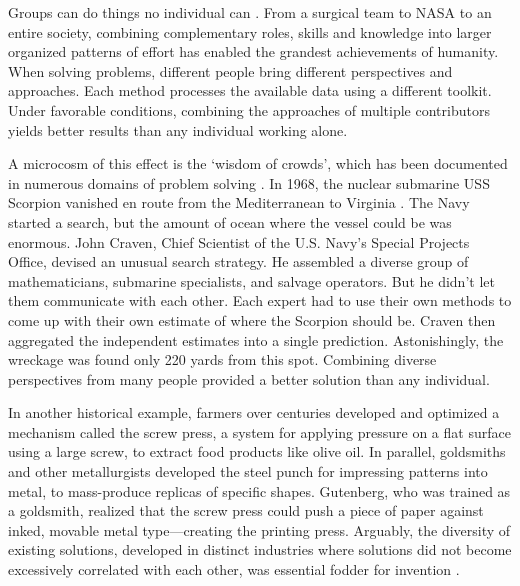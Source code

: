 \documentclass[11pt]{article}
\begin{document}

Groups can do things no individual can \citep{woolley2010evidence, coase1937nature, march1958organizations, coleman1988social, north1990institutions, smith1776inquiry, hayek1945use}. From a surgical team to NASA to an entire society, combining complementary roles, skills and knowledge into larger organized patterns of effort has enabled the grandest achievements of humanity. When solving problems, different people bring different perspectives and approaches. Each method processes the available data using a different toolkit. Under favorable conditions, combining the approaches of multiple contributors yields better results than any individual working alone. 

A microcosm of this effect is the `wisdom of crowds', which has been documented in numerous domains of problem solving \citep{surowiecki2005wisdom, condorcet1785essai}. In 1968, the nuclear submarine USS Scorpion vanished en route from the Mediterranean to Virginia \citep{sontag1998blind, craven2002silent, surowiecki2005wisdom}. The Navy started a search, but the amount of ocean where the vessel could be was enormous. John Craven, Chief Scientist of the U.S. Navy's Special Projects Office, devised an unusual search strategy. He assembled a diverse group of mathematicians, submarine specialists, and salvage operators. But he didn't let them communicate with each other. Each expert had to use their own methods to come up with their own estimate of where the Scorpion should be. Craven then aggregated the independent estimates into a single prediction. Astonishingly, the wreckage was found only 220 yards from this spot. Combining diverse perspectives from many people provided a better solution than any individual. 

In another historical example, farmers over centuries developed and optimized a mechanism called the screw press, a system for applying pressure on a flat surface using a large screw, to extract food products like olive oil. In parallel, goldsmiths and other metallurgists developed the steel punch for impressing patterns into metal, to mass-produce replicas of specific shapes. Gutenberg, who was trained as a goldsmith, realized that the screw press could push a piece of paper against inked, movable metal type---creating the printing press. Arguably, the diversity of existing solutions, developed in distinct industries where solutions did not become excessively correlated with each other, was essential fodder for invention \citep{johnson2010where, syed2019rebel}.
\end{document}
